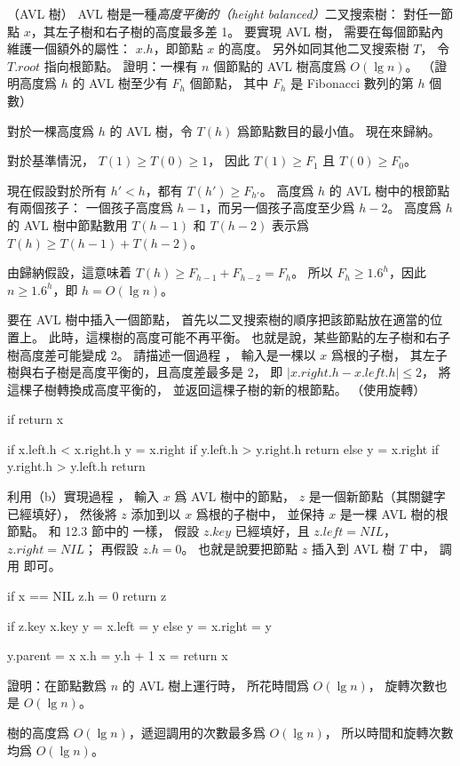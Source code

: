 
\startPROBLEM
（AVL 樹）
 AVL 樹是一種\emph{高度平衡的（height balanced）}二叉搜索樹：
對任一節點 $x$，其左子樹和右子樹的高度最多差 1。
要實現 AVL 樹，
需要在每個節點內維護一個額外的屬性： $x.h$，即節點 $x$ 的高度。
另外如同其他二叉搜索樹 $T$，
令 $T.root$ 指向根節點。
\startigBase[a]\startitem%
證明：一棵有 $n$ 個節點的 AVL 樹高度爲 $O(\lg n)$。
（\hint 證明高度爲 $h$ 的 AVL 樹至少有 $F_h$ 個節點，
其中 $F_h$ 是 Fibonacci 數列的第 $h$ 個數）
\stopitem\stopigBase

\startANSWER
對於一棵高度爲 $h$ 的 AVL 樹，令 $T(h)$ 爲節點數目的最小值。
現在來歸納。

對於基準情況， $T(1)\ge T(0)\ge 1$，
因此 $T(1)\ge F_1$ 且 $T(0)\ge F_0$。

現在假設對於所有 $h'<h$，都有 $T(h')\ge F_{h'}$。
高度爲 $h$ 的 AVL 樹中的根節點有兩個孩子：
一個孩子高度爲 $h-1$，而另一個孩子高度至少爲 $h-2$。
高度爲 $h$ 的 AVL 樹中節點數用 $T(h-1)$ 和 $T(h-2)$ 表示爲 $T(h)\ge T(h-1)+T(h-2)$。

由歸納假設，這意味着 $T(h)\ge F_{h-1} + F_{h-2} = F_h$。
所以 $F_h\ge 1.6^h$，因此 $n\ge 1.6^h$，即 $h=O(\lg n)$。
\stopANSWER

\startigBase[continue]\startitem%
要在 AVL 樹中插入一個節點，
首先以二叉搜索樹的順序把該節點放在適當的位置上。
此時，這棵樹的高度可能不再平衡。
也就是說，某些節點的左子樹和右子樹高度差可能變成 2。
請描述一個過程 ，
輸入是一棵以 $x$ 爲根的子樹，
其左子樹與右子樹是高度平衡的，且高度差最多是 2，
即 $|x.right.h - x.left.h|\le 2$，
將這棵子樹轉換成高度平衡的，
並返回這棵子樹的新的根節點。
（\hint 使用旋轉）
\stopitem\stopigBase

\startANSWER
{}
\startCLRSCODE
if  
	return x

if x.left.h < x.right.h
	y = x.right
	if y.left.h > y.right.h
	return 
else
	y = x.right
	if y.right.h > y.left.h
	return 
\stopCLRSCODE
\stopANSWER

\startigBase[continue]\startitem%
利用（b）實現過程 ，
輸入 $x$ 爲 AVL 樹中的節點， $z$ 是一個新節點（其關鍵字已經填好），
然後將 $z$ 添加到以 $x$ 爲根的子樹中，
並保持 $x$ 是一棵 AVL 樹的根節點。
和 12.3 節中的  一樣，
假設 $z.key$ 已經填好，且 $z.left=NIL$， $z.right=NIL$；
再假設 $z.h=0$。
也就是說要把節點 $z$ 插入到 AVL 樹 $T$ 中，
調用  即可。
\stopitem\stopigBase

\startANSWER
{}
\startCLRSCODE
if x == NIL
	z.h = 0
	return z

if z.key \le x.key
	y = 
	x.left = y
else
	y = 
	x.right = y

y.parent = x
x.h = y.h + 1
x = 
return x
\stopCLRSCODE
\stopANSWER

\startigBase[continue]\startitem%
證明：在節點數爲 $n$ 的 AVL 樹上運行時，
  所花時間爲 $O(\lg n)$，
旋轉次數也是 $O(\lg n)$。
\stopitem\stopigBase

\startANSWER
樹的高度爲 $O(\lg n)$，遞迴調用的次數最多爲 $O(\lg n)$，
所以時間和旋轉次數均爲 $O(\lg n)$。
\stopANSWER

\stopPROBLEM
